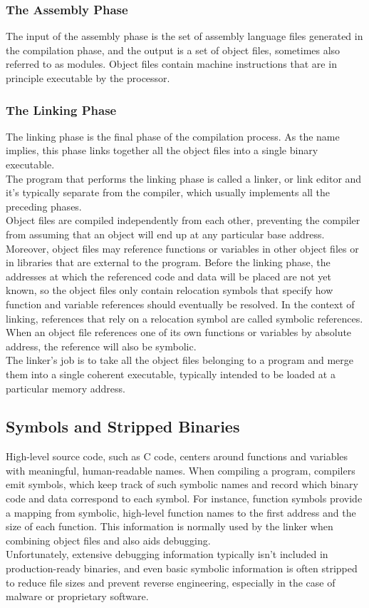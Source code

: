 \subsubsection{The Assembly Phase}
The input of the assembly phase is the set of assembly language files generated in the compilation phase, and the output is a set of object files, sometimes also referred to as modules. Object files contain machine instructions that are in principle executable by the processor.

\subsubsection{The Linking Phase}
The linking phase is the final phase of the compilation process. As the name implies, this phase links together all the object files into a single binary executable. \\
The program that performs the linking phase is called a linker, or link editor and it’s typically separate from the compiler, which usually implements all the preceding phases. \\
Object files are compiled independently from each other, preventing the compiler from assuming that an object will end up at any particular base address. Moreover, object files may reference functions or variables in other object files or in libraries that are external to the program. Before the linking phase, the addresses at which the referenced code and data will be placed are not yet known, so the object files only contain relocation symbols that specify how function and variable references should eventually be resolved. In the context of linking, references that rely on a relocation symbol are called symbolic references. When an object file references one of its own functions or variables by absolute address, the reference will also be symbolic. \\
The linker’s job is to take all the object files belonging to a program and merge them into a single coherent executable, typically intended to be loaded at a particular memory address.

\subsection{Symbols and Stripped Binaries}
High-level source code, such as C code, centers around functions and variables with meaningful, human-readable names. When compiling a program, compilers emit symbols, which keep track of such symbolic names and record which binary code and data correspond to each symbol. For instance, function symbols provide a mapping from symbolic, high-level function names to the first address and the size of each function. This information is normally used by the linker when combining object files and also aids debugging. \\
Unfortunately, extensive debugging information typically isn't included
in production-ready binaries, and even basic symbolic information is often
stripped to reduce file sizes and prevent reverse engineering, especially in
the case of malware or proprietary software.

